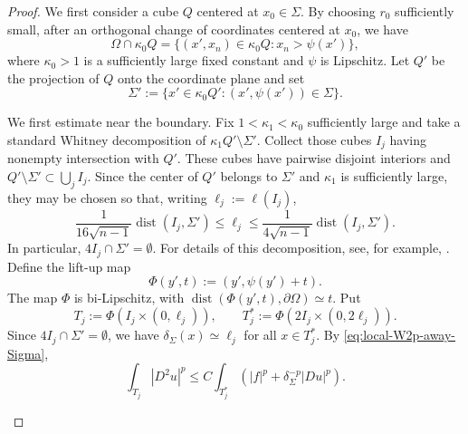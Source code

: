 \documentclass[12pt]{amsart}
\numberwithin{equation}{section}
\newcommand\dist{\operatorname{dist}}
\begin{document}
\begin{proof}
We first consider a cube $Q$ centered at $x_0\in\Sigma$. By choosing
$r_0$ sufficiently small, after an orthogonal change of coordinates centered
at $x_0$, we have
\[
 \Omega\cap \kappa_0 Q
 =\{(x',x_n)\in\kappa_0 Q:x_n>\psi(x')\},
\]
where $\kappa_0>1$ is a sufficiently large fixed constant and $\psi$ is
Lipschitz. Let $Q'$ be the projection of $Q$ onto the coordinate plane and set
\[
 \Sigma':=\{x'\in \kappa_0 Q':(x',\psi(x'))\in\Sigma\}.
\]

We first estimate near the boundary. Fix $1<\kappa_1<\kappa_0$ sufficiently large and take a standard Whitney decomposition of $\kappa_1Q'\setminus\Sigma'$. Collect those cubes $I_j$ having nonempty intersection with $Q'$. These cubes have pairwise disjoint interiors and $Q'\setminus\Sigma'\subset\bigcup_j I_j$. Since the center of $Q'$ belongs to $\Sigma'$ and $\kappa_1$ is sufficiently large, they may be chosen so that,
writing
$\ell_j:=\ell(I_j)$,
\[
 \frac{1}{16\sqrt{n-1}}\dist(I_j,\Sigma')
 \leq \ell_j
 \leq \frac{1}{4\sqrt{n-1}}\dist(I_j,\Sigma').
\]
In particular, $4I_j\cap\Sigma'=\emptyset$. For details of this decomposition, see, for example, \cite[Appendix~J]{MR2445437}. Define the lift-up map
\[
 \Phi(y',t):=(y',\psi(y')+t).
\]
The map $\Phi$ is bi-Lipschitz, with
$\dist(\Phi(y',t),\partial\Omega)\simeq t$. Put
\[
 T_j:=\Phi(I_j\times(0,\ell_j)),
 \qquad
 T_j^*:=\Phi(2I_j\times(0,2\ell_j)).
\]
Since $4I_j\cap\Sigma'=\emptyset$, we have
$\delta_\Sigma(x)\simeq\ell_j$ for all $x\in T_j^*$. By \eqref{eq:local-W2p-away-Sigma},
\begin{equation}\label{est-bdycube}
 \int_{T_j}|D^2u|^p
 \leq C\int_{T_j^*}
 \left(|f|^p+\delta_\Sigma^{-p}|Du|^p\right).
\end{equation}

\begin{figure}
\end{figure}
\end{proof}
\end{document}
